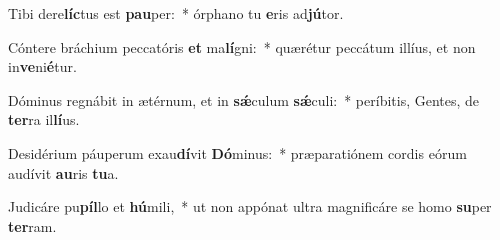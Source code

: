 \item Tibi dere\textbf{líc}tus est \textbf{pau}per:~* órphano tu \textbf{e}ris ad\textbf{jú}tor.
\item Cóntere bráchium peccatóris \textbf{et} ma\textbf{lí}gni:~* quærétur peccátum illíus, et non in\textbf{ve}ni\textbf{é}tur.
\item Dóminus regnábit in ætérnum, et in \textbf{sǽ}culum \textbf{sǽ}culi:~* períbitis, Gentes, de \textbf{ter}ra il\textbf{lí}us.
\item Desidérium páuperum exau\textbf{dí}vit \textbf{Dó}minus:~* præparatiónem cordis eórum audívit \textbf{au}ris \textbf{tu}a.
\item Judicáre pu\textbf{píl}lo et \textbf{hú}mili,~* ut non appónat ultra magnificáre se homo \textbf{su}per \textbf{ter}ram.

